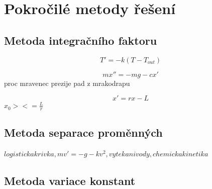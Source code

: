 \chapter{Pokročilé metody řešení}

\section{Metoda integračního faktoru}
\begin{příklad}
  \begin{equation*}
	  T'=-k(T-T_{out})
  \end{equation*}
\end{příklad}

\begin{příklad}[Padák]
\begin{equation*}
	mx''=-mg-cx'
\end{equation*}
proc mravenec prezije pad z mrakodrapu
\end{příklad}

\begin{příklad}
\begin{equation*}
x'=rx-L
\end{equation*}
$x_0 ><= \frac{L}{r}$
\end{příklad}

\section{Metoda separace proměnných}
\begin{Todo}
$logisticka krivka, mv'=-g-kv^2, vytekani vody, chemicka kinetika$
\end{Todo}

\section{Metoda variace konstant}
